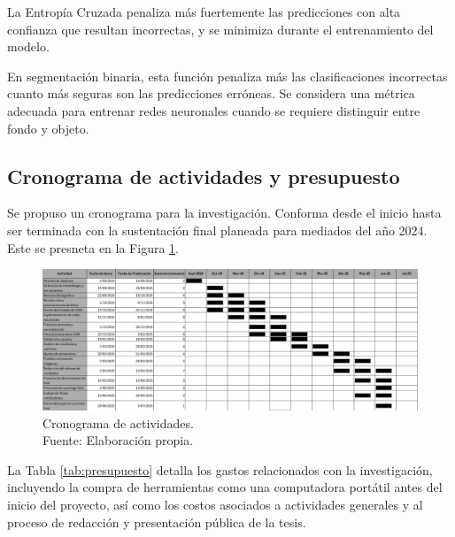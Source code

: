 \noindent La Entropía Cruzada penaliza más fuertemente las predicciones con alta confianza que resultan incorrectas, y se minimiza durante el entrenamiento del modelo.

En segmentación binaria, esta función penaliza más las clasificaciones incorrectas cuanto más seguras son las predicciones erróneas. Se considera una métrica adecuada para entrenar redes neuronales cuando se requiere distinguir entre fondo y objeto. \parencite{goodfellow2016deep}

\begin{landscape}
	\section{Cronograma de actividades y presupuesto}
	Se propuso un cronograma para la investigación. Conforma desde el inicio hasta ser terminada con la sustentación final planeada para mediados del año 2024. Este se presneta en la Figura \ref{3:fig7}.

	\begin{figure}[!ht]
		\begin{center}
			\includegraphics[width=1.50\textwidth]{3/figures/gant.png}
			\caption[Cronograma de actividades]{Cronograma de actividades.\\
				Fuente: Elaboración propia.}
			\label{3:fig7}
		\end{center}
	\end{figure}
	
\end{landscape}




La Tabla \ref{tab:presupuesto} detalla los gastos relacionados con la investigación, incluyendo la compra de herramientas como una computadora portátil antes del inicio del proyecto, así como los costos asociados a actividades generales y al proceso de redacción y presentación pública de la tesis.

